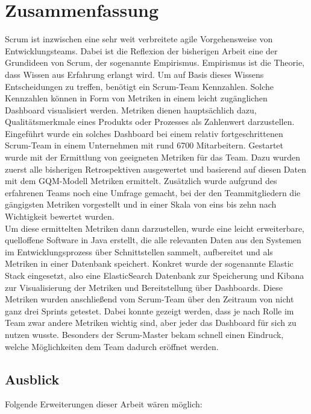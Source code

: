 \chapter{Zusammenfassung}

Scrum ist inzwischen eine sehr weit verbreitete agile Vorgehensweise von Entwicklungsteams.
Dabei ist die Reflexion der bisherigen Arbeit eine der Grundideen von Scrum, der sogenannte Empirismus.
Empirismus ist die Theorie, dass Wissen aus Erfahrung erlangt wird.
Um auf Basis dieses Wissens Entscheidungen zu treffen, benötigt ein Scrum-Team Kennzahlen.
Solche Kennzahlen können in Form von Metriken in einem leicht zugänglichen Dashboard visualisiert werden.
Metriken dienen hauptsächlich dazu, Qualitätsmerkmale eines Produkts oder Prozesses als Zahlenwert darzustellen.
\\
Eingeführt wurde ein solches Dashboard bei einem relativ fortgeschrittenen Scrum-Team in einem Unternehmen mit rund 6700 Mitarbeitern.
Gestartet wurde mit der Ermittlung von geeigneten Metriken für das Team.
Dazu wurden zuerst alle bisherigen Retrospektiven ausgewertet und basierend auf diesen Daten mit dem \ac{GQM}-Modell Metriken ermittelt.
Zusätzlich wurde aufgrund des erfahrenen Teams noch eine Umfrage gemacht, bei der den Teammitgliedern die gängigsten Metriken vorgestellt und in einer Skala von eins bis zehn nach Wichtigkeit bewertet wurden.
\\
Um diese ermittelten Metriken dann darzustellen, wurde eine leicht erweiterbare, quelloffene Software in Java erstellt, die alle relevanten Daten aus den Systemen im Entwicklungsprozess über Schnittstellen sammelt, aufbereitet und als Metriken in einer Datenbank speichert.
Konkret wurde der sogenannte Elastic Stack eingesetzt, also eine ElasticSearch Datenbank zur Speicherung und Kibana zur Visualisierung der Metriken und Bereitstellung über Dashboards.
Diese Metriken wurden anschließend vom Scrum-Team über den Zeitraum von nicht ganz drei Sprints getestet.
Dabei konnte gezeigt werden, dass je nach Rolle im Team zwar andere Metriken wichtig sind, aber jeder das Dashboard für sich zu nutzen wusste.
Besonders der Scrum-Master bekam schnell einen Eindruck, welche Möglichkeiten dem Team dadurch eröffnet werden.

\section*{Ausblick}

Folgende Erweiterungen dieser Arbeit wären möglich:

